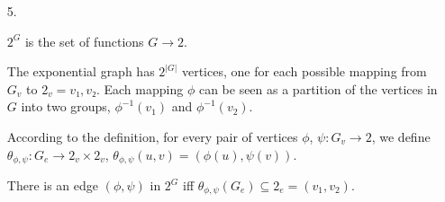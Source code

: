 \documentclass[a4paper,notitlepage]{article}
\begin{document}
\begin{enumerate}
\begin{enumerate}
\begin{proof}
\begin{description}
        $$f \circ \iota = \epsilon_{BC} \circ \iota \circ \left ( z ×  id_B × id_C  \right ) \circ \iota = \epsilon_{BC} \circ \iota \circ \left ( z^\prime ×  id_B × id_C  \right ) \circ \iota = f \circ \iota$$
        
        $$f \circ \iota = \epsilon_{BC} \circ \left ( \left ( z ×  id_C  \right ) ×   id_B  \right ) = \epsilon_{BC} \circ \left ( \left ( z^\prime ×  id_C  \right )  ×  id_B  \right )$$
        
        $$f \circ \iota = \epsilon_{B} \circ \left ( \epsilon_{C} ×  id_{B}  \right ) \circ \left ( \left ( z ×  id_C  \right ) ×  id_B  \right ) = \epsilon_{B} \circ \left ( \epsilon_{C} ×  id_B  \right ) \circ \left ( \left ( z^\prime ×  id_C  \right )  ×  id_B \right )$$
        
        $$f \circ \iota = \epsilon_{B} \circ \left ( \left ( \epsilon_C \circ \left ( z ×  id_C  \right ) \right ) × id_B \right )   = \epsilon_{B} \circ \left ( \left ( \epsilon_C \circ \left ( z^\prime ×  id_C  \right ) \right )  ×  id_B  \right )$$

        Universality of ($A^B$), $(— × B)$ is injective:
        $$\overline{f \circ \iota} = \epsilon_C \circ \left ( z × id_C \right ) = \epsilon_C \circ \left ( z^\prime × id_C \right )$$
        
        Universality of ($(A^B)^C$)
        $$\overline{\overline{f \circ \iota}} = z = z^\prime$$

     \end{description}

     \end{proof}

   \end{enumerate}

   \item[ 5.]

     $2^G$ is the set of functions $G → 2$.

     The exponential graph has $2^{\vert G \vert }$ vertices, one for each
     possible mapping from $G_v$ to $2_v = {v₁,v₂}$. Each mapping $\phi$ can be
     seen as a partition of the vertices in $G$ into two groups, $\phi^{-1}(v_1)$
     and $\phi^{-1}(v_2)$.

     According to the definition, for every pair of vertices $\phi$,
     $\psi : G_v → 2$, we define
     $\theta_{\phi,\psi} : G_e → 2_v \times 2_v$,
     $\theta_{\phi,\psi}(u,v) = (\phi(u), \psi(v))$.

     There is an edge $(\phi, \psi)$ in $2^G$ iff $\theta_{\phi,\psi}(G_e) \subseteq 2_e = {(v_1,v_2)}$.


\end{enumerate}
\end{document}
